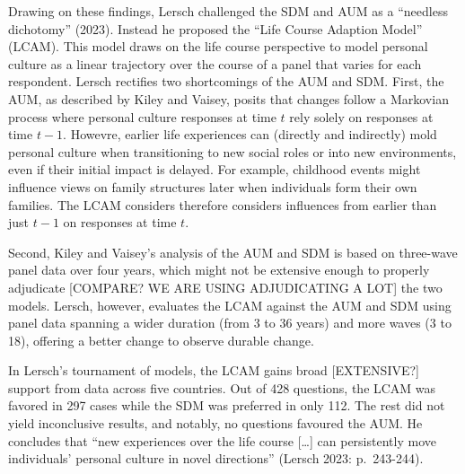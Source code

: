 \documentclass[
  11pt,
]{article}
\begin{document}
Drawing on these findings, Lersch challenged the SDM and AUM as a
``needless dichotomy'' (2023). Instead he proposed the ``Life Course
Adaption Model'' (LCAM). This model draws on the life course perspective
to model personal culture as a linear trajectory over the course of a
panel that varies for each respondent. Lersch rectifies two shortcomings
of the AUM and SDM. First, the AUM, as described by Kiley and Vaisey,
posits that changes follow a Markovian process where personal culture
responses at time \(t\) rely solely on responses at time \(t-1\).
Howevre, earlier life experiences can (directly and indirectly) mold
personal culture when transitioning to new social roles or into new
environments, even if their initial impact is delayed. For example,
childhood events might influence views on family structures later when
individuals form their own families. The LCAM considers therefore
considers influences from earlier than just \(t-1\) on responses at time
\(t\).

Second, Kiley and Vaisey's analysis of the AUM and SDM is based on
three-wave panel data over four years, which might not be extensive
enough to properly adjudicate {[}COMPARE? WE ARE USING ADJUDICATING A
LOT{]} the two models. Lersch, however, evaluates the LCAM against the
AUM and SDM using panel data spanning a wider duration (from 3 to 36
years) and more waves (3 to 18), offering a better change to observe
durable change.

In Lersch's tournament of models, the LCAM gains broad {[}EXTENSIVE?{]}
support from data across five countries. Out of 428 questions, the LCAM
was favored in 297 cases while the SDM was preferred in only 112. The
rest did not yield inconclusive results, and notably, no questions
favoured the AUM. He concludes that ``new experiences over the life
course {[}\ldots{]} can persistently move individuals' personal culture
in novel directions'' (Lersch 2023: p.~243-244).
\end{document}
